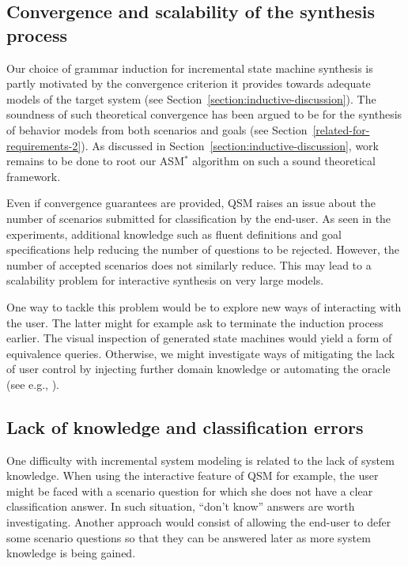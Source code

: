 \subsection*{Convergence and scalability of the synthesis process}

Our choice of grammar induction for incremental state machine synthesis is partly motivated by the convergence criterion it provides towards adequate models of the target system (see Section~\ref{section:inductive-discussion}). The soundness of such theoretical convergence has been argued to be for the synthesis of behavior models from both scenarios and goals (see Section~\ref{related-for-requirements-2}). As discussed in Section~\ref{section:inductive-discussion}, work remains to be done to root our ASM$^*$ algorithm on such a sound theoretical framework.

Even if convergence guarantees are provided, QSM raises an issue about the number of scenarios submitted for classification by the end-user. As seen in the experiments, additional knowledge such as fluent definitions and goal specifications help reducing the number of questions to be rejected. However, the number of accepted scenarios does not similarly reduce. This may lead to a scalability problem for interactive synthesis on very large models.

One way to tackle this problem would be to explore new ways of interacting with the user. The latter might for example ask to terminate the induction process earlier. The visual inspection of generated state machines would yield a form of equivalence queries. Otherwise, we might investigate ways of mitigating the lack of user control by injecting further domain knowledge or automating the oracle (see e.g., \cite{Walkinshaw:2007}).

\subsection*{Lack of knowledge and classification errors}

One difficulty with incremental system modeling is related to the lack of system knowledge. When using the interactive feature of QSM for example, the user might be faced with a scenario question for which she does not have a clear classification answer. In such situation, ``don't know'' answers are worth investigating. Another approach would consist of allowing the end-user to defer some scenario questions so that they can be answered later as more system knowledge is being gained.

